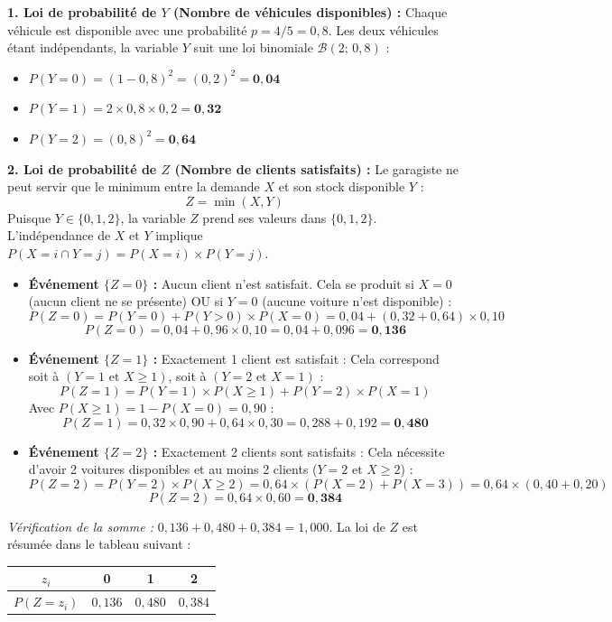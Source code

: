 \documentclass[11pt,a4paper]{article}
\begin{document}
\begin{correctionbox}[-- Modélisation conjointe \& Variable bivariée $Z = \min(X, Y)$]
\textbf{1. Loi de probabilité de $Y$ (Nombre de véhicules disponibles) :}
Chaque véhicule est disponible avec une probabilité $p = 4/5 = 0{,}8$. Les deux véhicules étant indépendants, la variable $Y$ suit une loi binomiale $\mathcal{B}(2; \, 0{,}8)$ :
\begin{itemize}[label=$\bullet$]
    \item $P(Y = 0) = (1 - 0{,}8)^2 = (0{,}2)^2 = \mathbf{0{,}04}$
    \item $P(Y = 1) = 2 \times 0{,}8 \times 0{,}2 = \mathbf{0{,}32}$
    \item $P(Y = 2) = (0{,}8)^2 = \mathbf{0{,}64}$
\end{itemize}

\textbf{2. Loi de probabilité de $Z$ (Nombre de clients satisfaits) :}
Le garagiste ne peut servir que le minimum entre la demande $X$ et son stock disponible $Y$ :
\[
Z = \min(X, Y)
\]
Puisque $Y \in \{0, 1, 2\}$, la variable $Z$ prend ses valeurs dans $\{0, 1, 2\}$.
L'indépendance de $X$ et $Y$ implique $P(X = i \cap Y = j) = P(X = i) \times P(Y = j)$.
\begin{itemize}[label=$\bullet$]
    \item \textbf{Événement $\{Z = 0\}$ :} Aucun client n'est satisfait. Cela se produit si $X = 0$ (aucun client ne se présente) OU si $Y = 0$ (aucune voiture n'est disponible) :
    \[
    P(Z = 0) = P(Y = 0) + P(Y > 0) \times P(X = 0) = 0{,}04 + (0{,}32 + 0{,}64) \times 0{,}10
    \]
    \[
    P(Z = 0) = 0{,}04 + 0{,}96 \times 0{,}10 = 0{,}04 + 0{,}096 = \mathbf{0{,}136}
    \]
    \item \textbf{Événement $\{Z = 1\}$ :} Exactement 1 client est satisfait :
    Cela correspond soit à $(Y = 1 \text{ et } X \ge 1)$, soit à $(Y = 2 \text{ et } X = 1)$ :
    \[
    P(Z = 1) = P(Y = 1) \times P(X \ge 1) + P(Y = 2) \times P(X = 1)
    \]
    Avec $P(X \ge 1) = 1 - P(X = 0) = 0{,}90$ :
    \[
    P(Z = 1) = 0{,}32 \times 0{,}90 + 0{,}64 \times 0{,}30 = 0{,}288 + 0{,}192 = \mathbf{0{,}480}
    \]
    \item \textbf{Événement $\{Z = 2\}$ :} Exactement 2 clients sont satisfaits :
    Cela nécessite d'avoir 2 voitures disponibles et au moins 2 clients ($Y = 2 \text{ et } X \ge 2$) :
    \[
    P(Z = 2) = P(Y = 2) \times P(X \ge 2) = 0{,}64 \times (P(X = 2) + P(X = 3)) = 0{,}64 \times (0{,}40 + 0{,}20)
    \]
    \[
    P(Z = 2) = 0{,}64 \times 0{,}60 = \mathbf{0{,}384}
    \]
\end{itemize}
\emph{Vérification de la somme :} $0{,}136 + 0{,}480 + 0{,}384 = 1{,}000$.
La loi de $Z$ est résumée dans le tableau suivant :
\begin{center}
\renewcommand{\arraystretch}{1.4}
\begin{tabular}{|c|c|c|c|}
    \hline
    $z_i$ & 0 & 1 & 2 \\
    \hline
    $P(Z = z_i)$ & $0{,}136$ & $0{,}480$ & $0{,}384$ \\
    \hline
\end{tabular}
\end{center}


\end{correctionbox}
\end{document}
